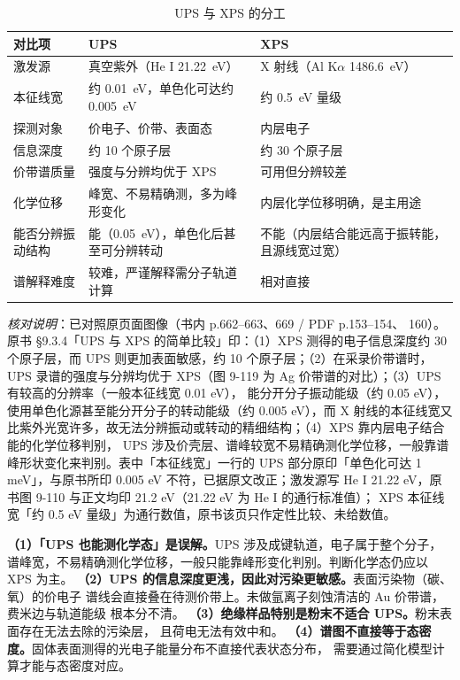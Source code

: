 \begin{table}[htbp]
\centering
\caption{UPS 与 XPS 的分工}
\label{tab:ups-xps}
{\srcsize
\begin{tabularx}{\columnwidth}{@{}lXX@{}}
\toprule
对比项 & UPS & XPS \\
\midrule
激发源 & 真空紫外（He I \qty{21.22}{eV}） & X 射线（Al K$\alpha$ \qty{1486.6}{eV}） \\
本征线宽 & 约 \qty{0.01}{eV}，单色化可达约 \qty{0.005}{eV} & 约 \qty{0.5}{eV} 量级 \\
探测对象 & 价电子、价带、表面态 & 内层电子 \\
信息深度 & 约 10 个原子层 & 约 30 个原子层 \\
价带谱质量 & 强度与分辨均优于 XPS & 可用但分辨较差 \\
化学位移 & 峰宽、不易精确测，多为峰形变化 & 内层化学位移明确，是主用途 \\
能否分辨振动结构 & 能（\qty{0.05}{eV}），单色化后甚至可分辨转动 & 不能（内层结合能远高于振转能，且源线宽过宽） \\
谱解释难度 & 较难，严谨解释需分子轨道计算 & 相对直接 \\
\bottomrule
\end{tabularx}}
\end{table}
\emph{核对说明}：已对照原页面图像（书内 p.662--663、669 / PDF p.153--154、
160）。原书 §9.3.4「UPS 与 XPS 的简单比较」印：（1）XPS 测得的电子信息深度约 30
个原子层，而 UPS 则更加表面敏感，约 10 个原子层；（2）在采录价带谱时，UPS 录谱的强度与分辨均优于
XPS（图 9-119 为 Ag 价带谱的对比）；（3）UPS 有较高的分辨率（一般本征线宽 0.01 eV），
能分开分子振动能级（约 0.05 eV），使用单色化源甚至能分开分子的转动能级（约 0.005 eV），而 X
射线的本征线宽又比紫外光宽许多，故无法分辨振动或转动的精细结构；（4）XPS 靠内层电子结合能的化学位移判别，
UPS 涉及价壳层、谱峰较宽不易精确测化学位移，一般靠谱峰形状变化来判别。表中「本征线宽」一行的 UPS
部分原印「单色化可达 1 meV」，与原书所印 0.005 eV 不符，已据原文改正；激发源写 He I
21.22 eV，原书图 9-110 与正文均印 21.2 eV（21.22 eV 为 He I 的通行标准值）；
XPS 本征线宽「约 0.5 eV 量级」为通行数值，原书该页只作定性比较、未给数值。

\begin{pitfall}
\textbf{（1）「UPS 也能测化学态」是误解。}UPS 涉及成键轨道，电子属于整个分子，
谱峰宽，不易精确测化学位移，一般只能靠峰形变化判别。判断化学态仍应以 XPS 为主。
\textbf{（2）UPS 的信息深度更浅，因此对污染更敏感。}表面污染物（碳、氧）的价电子
谱线会直接叠在待测价带上。未做氩离子刻蚀清洁的 Au 价带谱，费米边与轨道能级
根本分不清。
\textbf{（3）绝缘样品特别是粉末不适合 UPS。}粉末表面存在无法去除的污染层，
且荷电无法有效中和。
\textbf{（4）谱图不直接等于态密度。}固体表面测得的光电子能量分布不直接代表状态分布，
需要通过简化模型计算才能与态密度对应。
\end{pitfall}

